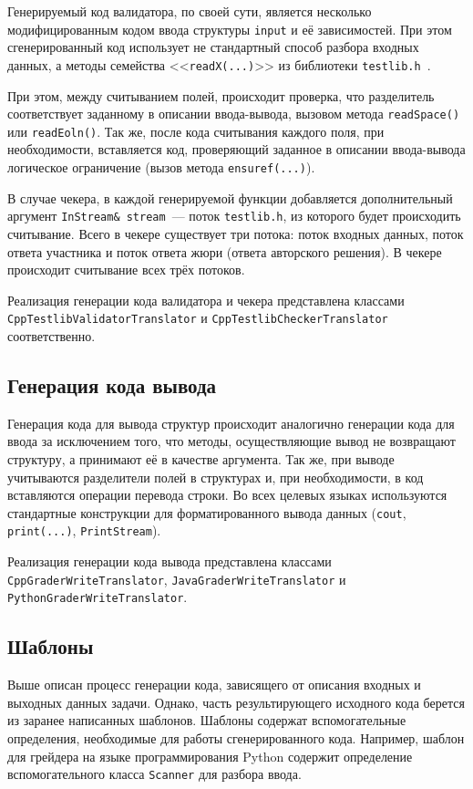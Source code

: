 \documentclass[times,specification,annotation]{style/itmo-student-thesis/itmo-student-thesis}
\begin{document}
Генерируемый код валидатора, по своей сути, является несколько модифицированным кодом ввода структуры \texttt{input} и её зависимостей. При этом сгенерированный код использует не стандартный способ разбора входных данных, а методы семейства <<\texttt{readX(...)}>> из библиотеки \texttt{testlib.h}~\cite{cf-testlib}. 

При этом, между считыванием полей, происходит проверка, что разделитель соответствует заданному в описании ввода-вывода, вызовом метода \texttt{readSpace()} или \texttt{readEoln()}. Так же, после кода считывания каждого поля, при необходимости, вставляется код, проверяющий заданное в описании ввода-вывода логическое ограничение (вызов метода \texttt{ensuref(...)}).

В случае чекера, в каждой генерируемой функции добавляется дополнительный аргумент \texttt{InStream\& stream}~--- поток \texttt{testlib.h}, из которого будет происходить считывание. Всего в чекере существует три потока: поток входных данных, поток ответа участника и поток ответа жюри (ответа авторского решения). В чекере происходит считывание всех трёх потоков.

Реализация генерации кода валидатора и чекера представлена классами \texttt{CppTestlibValidatorTranslator} и \texttt{CppTestlibCheckerTranslator} соответственно.

\subsection{Генерация кода вывода}

Генерация кода для вывода структур происходит аналогично генерации кода для ввода за исключением того, что методы, осуществляющие вывод не возвращают структуру, а принимают её в качестве аргумента. Так же, при выводе учитываются разделители полей в структурах и, при необходимости, в код вставляются операции перевода строки. Во всех целевых языках используются стандартные конструкции для форматированного вывода данных (\texttt{cout}, \texttt{print(...)}, \texttt{PrintStream}).

Реализация генерации кода вывода представлена классами \texttt{CppGraderWriteTranslator}, \texttt{JavaGraderWriteTranslator} и \texttt{PythonGraderWriteTranslator}.

\subsection{Шаблоны}

Выше описан процесс генерации кода, зависящего от описания входных и выходных данных задачи. Однако, часть результирующего исходного кода берется из заранее написанных шаблонов. Шаблоны содержат вспомогательные определения, необходимые для работы сгенерированного кода. Например, шаблон для грейдера на языке программирования Python содержит определение вспомогательного класса \texttt{Scanner} для разбора ввода.
\end{document}
